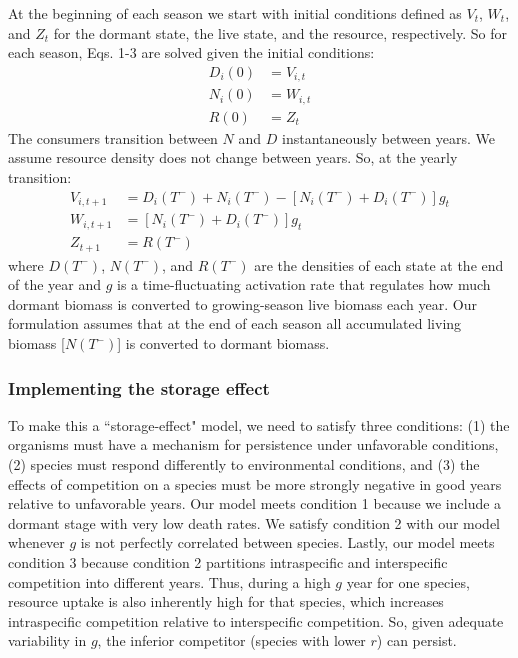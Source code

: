 \documentclass[12pt]{article}
\begin{document}
At the beginning of each season we start with initial conditions defined as $V_{t}$, $W_{t}$, and $Z_{t}$ for the dormant state, the live state, and the resource, respectively. So for each season, Eqs. 1-3 are solved given the initial conditions:
\begin{align}
  D_{i}(0) &= V_{i,t} \\
  N_{i}(0) &= W_{i,t} \\
  R(0) &= Z_{t}
\end{align}
The consumers transition between $N$ and $D$ instantaneously between years. We assume resource density does not change between years. So, at the yearly transition:
\begin{align}
  V_{i,t+1} &= D_{i}(T^-) + N_{i}(T^-) - [N_{i}(T^-)+D_{i}(T^-)]g_{t} \\
  W_{i,t+1} &= [N_{i}(T^-)+D_{i}(T^-)]g_{t} \\
  Z_{t+1} &= R(T^-)
\end{align}
where $D(T^-)$, $N(T^-)$, and $R(T^-)$ are the densities of each state at the end of the year and $g$ is a time-fluctuating activation rate that regulates how much dormant biomass is converted to growing-season live biomass each year. Our formulation assumes that at the end of each season all accumulated living biomass [$N(T^-)$] is converted to dormant biomass.

\subsubsection{Implementing the storage effect}
To make this a ``storage-effect" model, we need to satisfy three conditions: (1) the organisms must have a mechanism for persistence under unfavorable conditions, (2) species must respond differently to environmental conditions, and (3) the effects of competition on a species must be more strongly negative in good years relative to unfavorable years. Our model meets condition 1 because we include a dormant stage with very low death rates. We satisfy condition 2 with our model whenever $g$ is not perfectly correlated between species. Lastly, our model meets condition 3 because condition 2 partitions intraspecific and interspecific competition into different years. Thus, during a high $g$ year for one species, resource uptake is also inherently high for that species, which increases intraspecific competition relative to interspecific competition. So, given adequate variability in $g$, the inferior competitor (species with lower $r$) can persist.  
\end{document}
